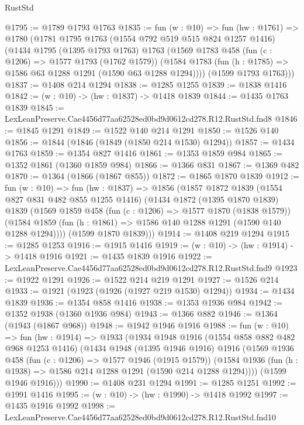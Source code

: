 \begin{lexlean}{RustStd}
\begin{coremodule}
@1795 := @1789 @1793 @1763
@1835 := fun (w : @10) =>
  fun (hw : @1761) =>
  @1780
    (@1781
      @1795
      @1763
      (@1554 @792 @519 @515 @824 @1257 @1416)
      (@1434
        @1795
        (@1395 @1793 @1763)
        @1763
        (@1569
          @1783
          @458
          (fun (c : @1206) => @1577 @1793 (@1762 @1579))
          (@1584 @1783 (fun (h : @1785) => @1586 @63 @1288 @1291 (@1590 @63 @1288 @1294))))
        (@1599 @1793 @1763)))
@1837 := @1408 @214 @1294
@1838 := @1285 @1255
@1839 := @1838 @1416
@1842 := (w : @10) -> (hw : @1837) -> @1418 @1839
@1844 := @1435 @1763 @1839
@1845 := LexLeanPreserve.Cae4456d77aa62528ed0bd9d0612cd278.R12.RustStd.fnd8
@1846 := @1845 @1291
@1849 := @1522 @140 @214 @1291
@1850 := @1526 @140
@1856 := @1844 (@1846 (@1849 (@1850 @214 @1530) @1294))
@1857 := @1434 @1763
@1859 := @1354 @827 @1416
@1861 := @1353 @1859 @984
@1865 := @1352 @1861 (@1360 @1859 @984)
@1866 := @1366 @831
@1867 := @1369 @482
@1870 := @1364 (@1866 (@1867 @855))
@1872 := @1865 @1870 @1839
@1912 := fun (w : @10) =>
  fun (hw : @1837) =>
  @1856
    (@1857
      @1872
      @1839
      (@1554 @827 @831 @482 @855 @1255 @1416)
      (@1434
        @1872
        (@1395 @1870 @1839)
        @1839
        (@1569
          @1859
          @458
          (fun (c : @1206) => @1577 @1870 (@1838 @1579))
          (@1584 @1859 (fun (h : @1861) => @1586 @140 @1288 @1291 (@1590 @140 @1288 @1294))))
        (@1599 @1870 @1839)))
@1914 := @1408 @219 @1294
@1915 := @1285 @1253
@1916 := @1915 @1416
@1919 := (w : @10) -> (hw : @1914) -> @1418 @1916
@1921 := @1435 @1839 @1916
@1922 := LexLeanPreserve.Cae4456d77aa62528ed0bd9d0612cd278.R12.RustStd.fnd9
@1923 := @1922 @1291
@1926 := @1522 @214 @219 @1291
@1927 := @1526 @214
@1933 := @1921 (@1923 (@1926 (@1927 @219 @1530) @1294))
@1934 := @1434 @1839
@1936 := @1354 @858 @1416
@1938 := @1353 @1936 @984
@1942 := @1352 @1938 (@1360 @1936 @984)
@1943 := @1366 @882
@1946 := @1364 (@1943 (@1867 @968))
@1948 := @1942 @1946 @1916
@1988 := fun (w : @10) =>
  fun (hw : @1914) =>
  @1933
    (@1934
      @1948
      @1916
      (@1554 @858 @882 @482 @968 @1253 @1416)
      (@1434
        @1948
        (@1395 @1946 @1916)
        @1916
        (@1569
          @1936
          @458
          (fun (c : @1206) => @1577 @1946 (@1915 @1579))
          (@1584 @1936 (fun (h : @1938) => @1586 @214 @1288 @1291 (@1590 @214 @1288 @1294))))
        (@1599 @1946 @1916)))
@1990 := @1408 @231 @1294
@1991 := @1285 @1251
@1992 := @1991 @1416
@1995 := (w : @10) -> (hw : @1990) -> @1418 @1992
@1997 := @1435 @1916 @1992
@1998 := LexLeanPreserve.Cae4456d77aa62528ed0bd9d0612cd278.R12.RustStd.fnd10

\end{coremodule}
\end{lexlean}
